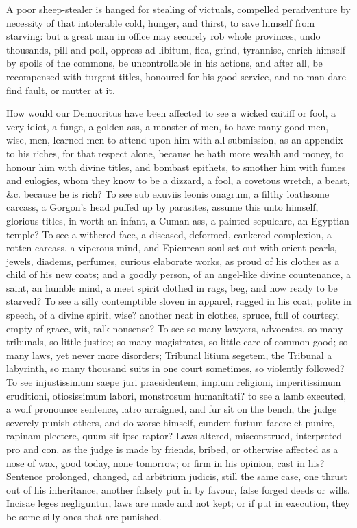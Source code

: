 {A poor sheep-stealer is hanged for stealing of victuals, compelled
peradventure by necessity of that intolerable cold, hunger, and thirst,
to save himself from starving: but a great man in office may
securely rob whole provinces, undo thousands, pill and poll, oppress ad
libitum, flea, grind, tyrannise, enrich himself by spoils of the
commons, be uncontrollable in his actions, and after all, be
recompensed with turgent titles, honoured for his good service, and no
man dare find fault, or  mutter at it.

How would our Democritus have been affected to see a wicked caitiff or
fool, a very idiot, a funge, a golden ass, a monster of men, to
have many good men, wise, men, learned men to attend upon him with all
submission, as an appendix to his riches, for that respect alone,
because he hath more wealth and money, to honour him with divine
titles, and bombast epithets, to smother him with fumes and eulogies,
whom they know to be a dizzard, a fool, a covetous wretch, a beast, \&c.
because he is rich? To see sub exuviis leonis onagrum, a filthy
loathsome carcass, a Gorgon's head puffed up by parasites, assume this
unto himself, glorious titles, in worth an infant, a Cuman ass, a
painted sepulchre, an Egyptian temple? To see a withered face, a
diseased, deformed, cankered complexion, a rotten carcass, a viperous
mind, and Epicurean soul set out with orient pearls, jewels, diadems,
perfumes, curious elaborate works, as proud of his clothes as a child
of his new coats; and a goodly person, of an angel-like divine
countenance, a saint, an humble mind, a meet spirit clothed in rags,
beg, and now ready to be starved? To see a silly contemptible sloven in
apparel, ragged in his coat, polite in speech, of a divine spirit,
wise? another neat in clothes, spruce, full of courtesy, empty of
grace, wit, talk nonsense?
To see so many lawyers, advocates, so many tribunals, so little
justice; so many magistrates, so little care of common good; so many
laws, yet never more disorders; Tribunal litium segetem, the Tribunal a
labyrinth, so many thousand suits in one court sometimes, so violently
followed? To see injustissimum saepe juri praesidentem, impium
religioni, imperitissimum eruditioni, otiosissimum labori, monstrosum
humanitati? to see a lamb executed, a wolf pronounce sentence,
latro arraigned, and fur sit on the bench, the judge severely punish
others, and do worse himself,  cundem furtum facere et punire,
rapinam plectere, quum sit ipse raptor? Laws altered,
misconstrued, interpreted pro and con, as the judge is made by
friends, bribed, or otherwise affected as a nose of wax, good today,
none tomorrow; or firm in his opinion, cast in his? Sentence prolonged,
changed, ad arbitrium judicis, still the same case, one thrust out
of his inheritance, another falsely put in by favour, false forged
deeds or wills. Incisae leges negliguntur, laws are made and not kept;
or if put in execution, they be some silly ones that are punished.

}
